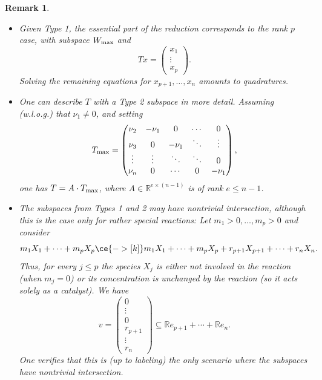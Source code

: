 \documentclass{article}
\newtheorem{remark}{Remark}
\begin{document}
\begin{remark}{\em 
\begin{itemize}
\item Given Type 1, the essential part of the reduction corresponds to the rank $p$ case, with subspace $W_{\rm max}$ and
\[
Tx=\begin{pmatrix} x_1\\ \vdots\\ x_p\end{pmatrix}.
\]
Solving the remaining equations for $x_{p+1},\ldots,x_n$ amounts to quadratures.
\item One can describe $T$ with a  Type 2 subspace in more detail. Assuming (w.l.o.g.) that $\nu_1\not=0$, and setting
\[
T_{\rm max}=\begin{pmatrix} \nu_2&-\nu_1&0&\cdots&0\\
                                              \nu_3&0&-\nu_1&\ddots & \vdots\\
                                            \vdots &\vdots&\ddots&\ddots&0\\
                                               \nu_n&0&\cdots&0&-\nu_1
\end{pmatrix},
\]
one has $T=A\cdot T_{\rm max}$, where $A\in \mathbb R^{e\times (n-1)}$ is of rank $e\leq n-1$. 
\item The subspaces from Types 1 and 2 may have nontrivial intersection, although this is the case only for rather special reactions: Let $m_1>0,\ldots,m_p>0$ and consider
\begin{equation*}
m_1X_1+\cdots+m_pX_p  \ce {->[k]} m_1X_1+\cdots+m_pX_p+r_{p+1}X_{p+1}+\cdots+r_nX_n.
\end{equation*}
Thus, for every $j\leq p$ the species $X_j$ is either not involved in the reaction (when $m_j=0$) or its concentration is unchanged by the reaction (so it acts solely as a catalyst). We have 
\[v=\begin{pmatrix} 0\\ \vdots\\0\\r_{p+1}\\ \vdots\\r_n\end{pmatrix}\subseteq \mathbb Re_{p+1}+\cdots+\mathbb Re_n.\]
 One verifies that this is (up to labeling) the only scenario where the subspaces have nontrivial intersection.
\end{itemize}}
\end{remark}

\end{document}
